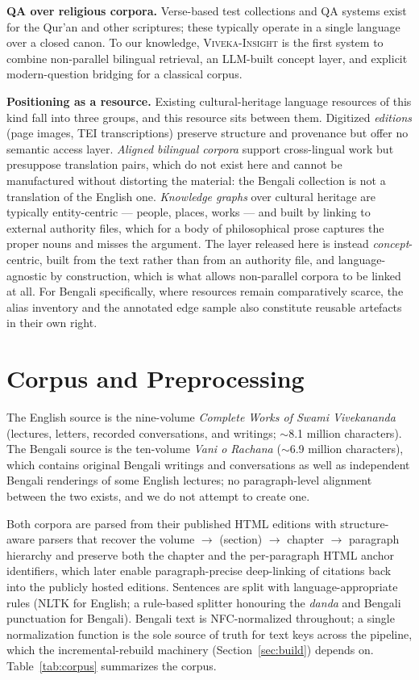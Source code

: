 \documentclass[pdflatex,sn-mathphys-num]{sn-jnl}
\newcommand{\system}{\textsc{Viveka-Insight}}
\begin{document}
\textbf{QA over religious corpora.} Verse-based test collections and QA
systems exist for the Qur'an \cite{malhas2020ayatec} and other
scriptures; these typically operate in a single language over a closed
canon. To our knowledge, \system{} is the first system to combine
non-parallel bilingual retrieval, an LLM-built concept layer, and
explicit modern-question bridging for a classical corpus.

\textbf{Positioning as a resource.} Existing cultural-heritage language
resources of this kind fall into three groups, and this resource sits
between them. Digitized \emph{editions} (page images, TEI transcriptions)
preserve structure and provenance but offer no semantic access layer.
\emph{Aligned bilingual corpora} support cross-lingual work but presuppose
translation pairs, which do not exist here and cannot be manufactured
without distorting the material: the Bengali collection is not a
translation of the English one. \emph{Knowledge graphs} over cultural
heritage are typically entity-centric --- people, places, works --- and
built by linking to external authority files, which for a body of
philosophical prose captures the proper nouns and misses the argument.
The layer released here is instead \emph{concept}-centric, built from
the text rather than from an authority file, and language-agnostic by
construction, which is what allows non-parallel corpora to be linked at
all. For Bengali specifically, where resources remain
comparatively scarce, the alias inventory and the annotated edge sample
also constitute reusable artefacts in their own right.

\section{Corpus and Preprocessing}
\label{sec:corpus}

The English source is the nine-volume \emph{Complete Works of Swami
Vivekananda} (lectures, letters, recorded conversations, and writings;
$\sim$8.1 million characters). The Bengali source is the ten-volume
\emph{Vani o Rachana} ($\sim$6.9 million characters), which contains
original Bengali writings and conversations as well as independent
Bengali renderings of some English lectures; no paragraph-level alignment
between the two exists, and we do not attempt to create one.

Both corpora are parsed from their published HTML editions with
structure-aware parsers that recover the volume $\to$ (section) $\to$
chapter $\to$ paragraph hierarchy and preserve both the chapter and the
per-paragraph HTML anchor identifiers, which later enable paragraph-precise
deep-linking of citations back into the publicly hosted editions. Sentences are split with language-appropriate
rules (NLTK \cite{bird2004nltk} for English; a rule-based splitter
honouring the \emph{danda} and Bengali punctuation for Bengali). Bengali
text is NFC-normalized throughout; a single normalization function is the
sole source of truth for text keys across the pipeline, which the
incremental-rebuild machinery (Section~\ref{sec:build}) depends on.
Table~\ref{tab:corpus} summarizes the corpus.
\end{document}
